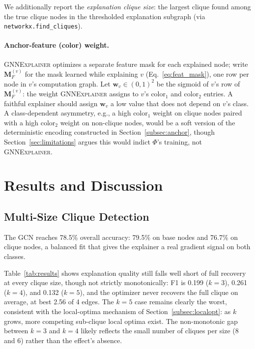 \documentclass{article}
\newcommand{\GNNEx}{\textsc{GNNExplainer}\xspace}
\newcommand{\bfM}{\mathbf{M}}
\newcommand{\bfw}{\mathbf{w}}
\theoremstyle{definition}
\begin{document}
We additionally report the \emph{explanation clique size}: the largest clique
found among the true clique nodes in the thresholded explanation subgraph
(via \texttt{networkx.find\_cliques}).

\paragraph{Anchor-feature (color) weight.}
\GNNEx optimizes a separate feature mask for each explained node; write
$\bfM_F^{(v)}$ for the mask learned while explaining $v$
(Eq.~\ref{eq:feat_mask}), one row per node in $v$'s computation graph. Let
$\bfw_v \in (0,1)^2$ be the sigmoid of $v$'s row of $\bfM_F^{(v)}$: the
weight \GNNEx assigns to $v$'s $\text{color}_1$ and $\text{color}_2$
entries. A faithful explainer should assign $\bfw_v$ a low value that does
not depend on $v$'s class. A class-dependent asymmetry,
e.g., a high $\text{color}_1$ weight on clique nodes paired with a high
$\text{color}_2$ weight on non-clique nodes, would be a soft version of the
deterministic encoding constructed in Section~\ref{subsec:anchor}, though
Section~\ref{sec:limitations} argues this would indict $\Phi$'s training,
not \GNNEx.


\section{Results and Discussion}
\label{sec:results}

\subsection{Multi-Size Clique Detection}

The GCN reaches 78.5\% overall accuracy: 79.5\% on base nodes and 76.7\% on
clique nodes, a balanced fit that gives the explainer a real gradient
signal on both classes.

Table~\ref{tab:results} shows explanation quality still falls well short of
full recovery at every clique size, though not strictly monotonically: F1
is 0.199 ($k=3$), 0.261 ($k=4$), and 0.132 ($k=5$), and the optimizer never
recovers the full clique on average, at best 2.56 of 4 edges. The $k=5$
case remains clearly the worst, consistent with the local-optima mechanism
of Section~\ref{subsec:localopt}: as $k$ grows, more competing sub-clique
local optima exist. The non-monotonic gap between $k=3$ and $k=4$ likely
reflects the small number of cliques per size (8 and 6) rather than the
effect's absence.
\end{document}
